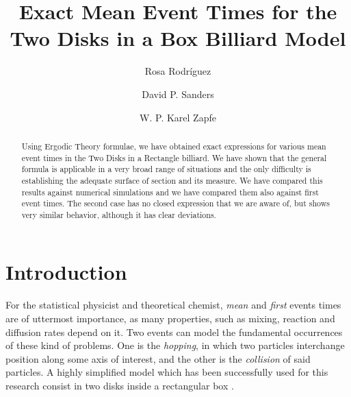 \documentclass[letterpaper,10pt, jcp, aps]{revtex4-1}
\begin{document}
\title{Exact Mean Event Times for the Two Disks in a Box Billiard Model}

\author{Rosa Rodríguez}

\author{David P. Sanders}

\author{W. P. Karel Zapfe}


\begin{abstract}
Using Ergodic Theory formulae, we have obtained 
exact expressions for various  mean event times in the Two Disks in a Rectangle
billiard.  We have shown that the general formula is applicable in a very broad range
of situations and the only difficulty is establishing the adequate surface
of section and its measure.  
We have compared this results against
numerical simulations and we have compared them also against first event times.
The second case has no closed expression that we are aware of, but shows
very similar behavior, although it has clear deviations.   
\end{abstract}

\maketitle



\section{Introduction}


For the statistical physicist and theoretical
chemist, \emph{mean} and \emph{first} events
times are of uttermost importance, as many properties,
such as mixing, reaction and diffusion rates depend on it. 
Two events can model the fundamental occurrences of
these kind of problems. One is the \emph{hopping},
in which two particles interchange position along some
axis of interest, and the other
is the \emph{collision} of said particles. 
A highly simplified model which has been successfully  used for
this research consist in two disks inside a rectangular
box \cite{Awazu01, Munakata02, Suh05}.
\end{document}
